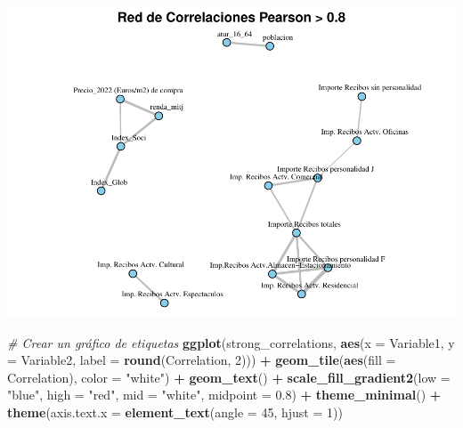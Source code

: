 \documentclass[notspecified,article,submit,moreauthors,pdftex]{Definitions/mdpi}
\newenvironment{Shaded}{\begin{snugshade}}{\end{snugshade}}
\newcommand{\AttributeTok}[1]{\textcolor[rgb]{0.13,0.29,0.53}{#1}}
\newcommand{\CommentTok}[1]{\textcolor[rgb]{0.56,0.35,0.01}{\textit{#1}}}
\newcommand{\DecValTok}[1]{\textcolor[rgb]{0.00,0.00,0.81}{#1}}
\newcommand{\FloatTok}[1]{\textcolor[rgb]{0.00,0.00,0.81}{#1}}
\newcommand{\FunctionTok}[1]{\textcolor[rgb]{0.13,0.29,0.53}{\textbf{#1}}}
\newcommand{\NormalTok}[1]{#1}
\newcommand{\SpecialCharTok}[1]{\textcolor[rgb]{0.81,0.36,0.00}{\textbf{#1}}}
\newcommand{\StringTok}[1]{\textcolor[rgb]{0.31,0.60,0.02}{#1}}
\begin{document}
\begin{center}\includegraphics{./figure/unnamed-chunk-17-1} \end{center}

\begin{Shaded}
\begin{Highlighting}[]
\CommentTok{\# Crear un gráfico de etiquetas}
\FunctionTok{ggplot}\NormalTok{(strong\_correlations, }\FunctionTok{aes}\NormalTok{(}\AttributeTok{x =}\NormalTok{ Variable1, }\AttributeTok{y =}\NormalTok{ Variable2, }\AttributeTok{label =} \FunctionTok{round}\NormalTok{(Correlation, }\DecValTok{2}\NormalTok{))) }\SpecialCharTok{+}
  \FunctionTok{geom\_tile}\NormalTok{(}\FunctionTok{aes}\NormalTok{(}\AttributeTok{fill =}\NormalTok{ Correlation), }\AttributeTok{color =} \StringTok{"white"}\NormalTok{) }\SpecialCharTok{+}
  \FunctionTok{geom\_text}\NormalTok{() }\SpecialCharTok{+}
  \FunctionTok{scale\_fill\_gradient2}\NormalTok{(}\AttributeTok{low =} \StringTok{"blue"}\NormalTok{, }\AttributeTok{high =} \StringTok{"red"}\NormalTok{, }\AttributeTok{mid =} \StringTok{"white"}\NormalTok{, }\AttributeTok{midpoint =} \FloatTok{0.8}\NormalTok{) }\SpecialCharTok{+}
  \FunctionTok{theme\_minimal}\NormalTok{() }\SpecialCharTok{+}
  \FunctionTok{theme}\NormalTok{(}\AttributeTok{axis.text.x =} \FunctionTok{element\_text}\NormalTok{(}\AttributeTok{angle =} \DecValTok{45}\NormalTok{, }\AttributeTok{hjust =} \DecValTok{1}\NormalTok{))}
\end{Highlighting}
\end{Shaded}
\end{document}
